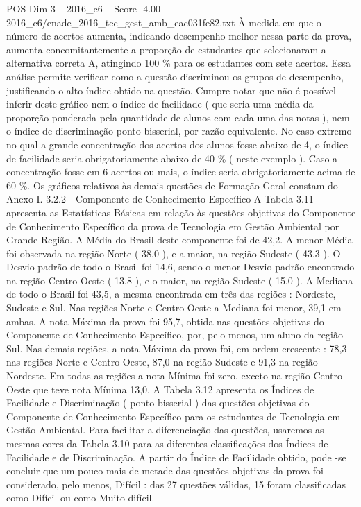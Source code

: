 \begin{textsample}{POS Dim 3 – 2016\_c6 – Score -4.00 – 2016\_c6/enade\_2016\_tec\_gest\_amb\_eac031fe82.txt}
À medida em que o número de acertos aumenta, indicando desempenho melhor nessa parte da prova, aumenta concomitantemente a proporção de estudantes que selecionaram a alternativa correta A, atingindo 100 \% para os estudantes com sete acertos.
Essa análise permite verificar como a questão discriminou os grupos de desempenho, justificando o alto índice obtido na questão.
Cumpre notar que não é possível inferir deste gráfico nem o índice de facilidade ( que seria uma média da proporção ponderada pela quantidade de alunos com cada uma das notas ), nem o índice de discriminação ponto-bisserial, por razão equivalente.
No caso extremo no qual a grande concentração dos acertos dos alunos fosse abaixo de 4, o índice de facilidade seria obrigatoriamente abaixo de 40 \% ( neste exemplo ).
Caso a concentração fosse em 6 acertos ou mais, o índice seria obrigatoriamente acima de 60 \%.
Os gráficos relativos às demais questões de Formação Geral constam do Anexo I. 3.2.2 - Componente de Conhecimento Específico A Tabela 3.11 apresenta as Estatísticas Básicas em relação às questões objetivas do Componente de Conhecimento Específico da prova de Tecnologia em Gestão Ambiental por Grande Região.
A Média do Brasil deste componente foi de 42,2.
A menor Média foi observada na região Norte ( 38,0 ), e a maior, na região Sudeste ( 43,3 ).
O Desvio padrão de todo o Brasil foi 14,6, sendo o menor Desvio padrão encontrado na região Centro-Oeste ( 13,8 ), e o maior, na região Sudeste ( 15,0 ).
A Mediana de todo o Brasil foi 43,5, a mesma encontrada em três das regiões : Nordeste, Sudeste e Sul.
Nas regiões Norte e Centro-Oeste a Mediana foi menor, 39,1 em ambas.
A nota Máxima da prova foi 95,7, obtida nas questões objetivas do Componente de Conhecimento Específico, por, pelo menos, um aluno da região Sul.
Nas demais regiões, a nota Máxima da prova foi, em ordem crescente : 78,3 nas regiões Norte e Centro-Oeste, 87,0 na região Sudeste e 91,3 na região Nordeste.
Em todas as regiões a nota Mínima foi zero, exceto na região Centro-Oeste que teve nota Mínima 13,0.
A Tabela 3.12 apresenta os Índices de Facilidade e Discriminação ( ponto-bisserial ) das questões objetivas do Componente de Conhecimento Específico para os estudantes de Tecnologia em Gestão Ambiental.
Para facilitar a diferenciação das questões, usaremos as mesmas cores da Tabela 3.10 para as diferentes classificações dos Índices de Facilidade e de Discriminação.
A partir do Índice de Facilidade obtido, pode -se concluir que um pouco mais de metade das questões objetivas da prova foi considerado, pelo menos, Difícil : das 27 questões válidas, 15 foram classificadas como Difícil ou como Muito difícil.

\end{textsample}
